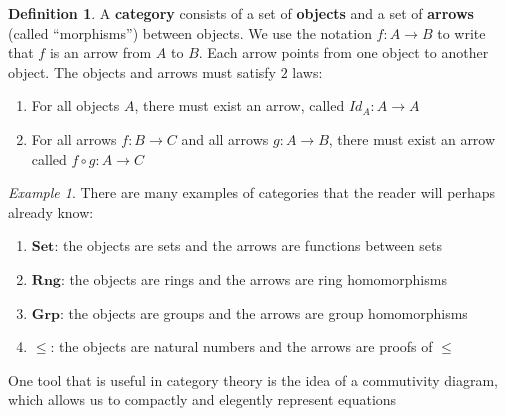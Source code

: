 \documentclass[14pt]{extarticle}  %
\theoremstyle{plain}
\theoremstyle{definition}
\newtheorem{defn}[thm]{Definition}
\theoremstyle{remark}
\newtheorem*{ex}{Example}
\begin{document}
\begin{defn}
  A \textbf{category} consists of a set of \textbf{objects} and a set of \textbf{arrows} (called ``morphisms'') between objects. We use the notation $f : A \to B$ to write that $f$
  is an arrow from $A$ to $B$. Each arrow points from one
  object to another object. The objects and arrows must satisfy $2$ laws:
  \begin{enumerate}
    \item For all objects $A$, there must exist an arrow, called $Id_{A} : A \to A$
    \item For all arrows $f: B \to  C$ and all arrows $g : A \to B$, there must exist an arrow called $f \circ g : A \to C$
\end{enumerate}
\end{defn}

\begin{ex}
  There are many examples of categories that the reader will perhaps already know:
  \begin{enumerate}
    \item $\textbf{Set}$: the objects are sets and the arrows are functions between sets
    \item $\textbf{Rng}$: the objects are rings and the arrows are ring homomorphisms
    \item $\textbf{Grp}$: the objects are groups and the arrows are group homomorphisms
    \item $\le$: the objects are natural numbers and the arrows are proofs of $\le$
    \end{enumerate}
\end{ex}


One tool that is useful in category theory is the idea of a commutivity diagram, which allows us to compactly and elegently represent equations
\end{document}
